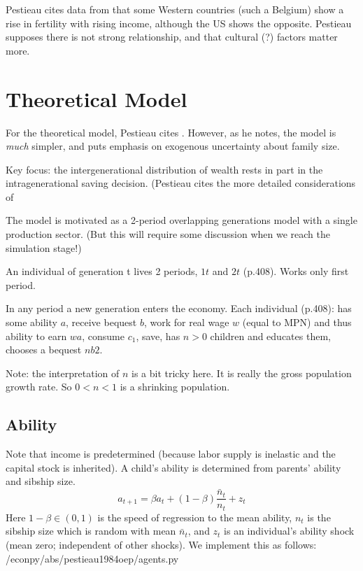 \documentclass{article}
\begin{document}
Pestieau cites data from \citet{un-1976-fertility} that some Western countries (such a Belgium) show a rise in fertility with rising income, although the US shows the opposite.
Pestieau supposes there is not strong relationship,
and that cultural (?) factors matter more.

\section{Theoretical Model}

For the theoretical model, Pestieau cites \citet{becker-1981-treatise}.
However, as he notes, the model is \emph{much} simpler, and puts emphasis on exogenous uncertainty about family size.

Key focus: the intergenerational distribution of wealth rests in part in the intragenerational saving decision.
(Pestieau cites the more detailed considerations of

The model is motivated as a 2-period overlapping generations model with a single production sector.
(But this will require some discussion when we reach the simulation stage!)

An individual of generation t lives 2 periods, $1t$ and $2t$ (p.408).
Works only first period.

In any period a new generation enters the economy.
Each individual (p.408):
has some ability $a$,
receive bequest $b$,
work for real wage $w$ (equal to MPN) and thus ability to earn $wa$,
consume $c_{1}$,
save,
has $n>0$ children and educates them,
chooses a bequest $n b2$.

Note: the interpretation of $n$ is a bit tricky here.
It is really the gross population growth rate.
So $0<n<1$ is a shrinking population.

\subsection{Ability}

Note that income is predetermined (because labor supply is inelastic and
the capital stock is inherited).
A child's ability is determined from parents' ability and sibship size.
\begin{equation}
a_{t+1} = \beta a_{t} + (1-\beta)\frac{\bar{n}_{t}}{n_{t}} + z_{t}
\label{Pestieau3}\tag{Pestieau 3}
\end{equation}
Here $1-\beta \in (0,1)$ is the speed of regression to the mean ability,
$n_{t}$ is the sibship size which is random with mean $\bar{n}_{t}$,
and $z_{t}$ is an individual's ability shock (mean zero; independent of other shocks).
We implement this as follows:
%
{/econpy/abs/pestieau1984oep/agents.py}
\end{document}
